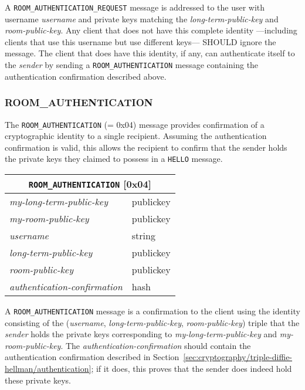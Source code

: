 \documentclass{article}
\def\message#1{\texttt{#1}}
\def\field#1{\textit{#1}}
\def\type#1{\textsf{#1}}
\newenvironment{basicmessage}[2]{
\newcommand{\messagefield}[2]{
\field{##1} & \type{##2} \\
\hline
}
\hspace{2em minus 2em}\begin{tabular}{|l|l|}
\hline
\multicolumn{2}{|c|}{\message{#1} [#2]} \\
\hline
\hline
}{
\end{tabular}
}
\begin{document}
A \message{ROOM\_AUTHENTICATION\_REQUEST} message is addressed to the user with username \field{username} and private keys matching the \field{long-term-public-key} and \field{room-public-key}.
Any client that does not have this complete identity ---including clients that use this username but use different keys--- SHOULD ignore the message.
The client that does have this identity, if any, can authenticate itself to the \field{sender} by sending a \message{ROOM\_AUTHENTICATION} message containing the authentication confirmation described above.


\subsubsection{ROOM\_AUTHENTICATION}
\label{sec:messages/room-authentication}

The \message{ROOM\_AUTHENTICATION} (= 0x04) message provides confirmation of a cryptographic identity to a single recipient.
Assuming the authentication confirmation is valid, this allows the recipient to confirm that the sender holds the private keys they claimed to possess in a \message{HELLO} message.

\begin{basicmessage}{ROOM\_AUTHENTICATION}{0x04}
\messagefield{my-long-term-public-key}{publickey}
\messagefield{my-room-public-key}{publickey}
\messagefield{username}{string}
\messagefield{long-term-public-key}{publickey}
\messagefield{room-public-key}{publickey}
\messagefield{authentication-confirmation}{hash}
\end{basicmessage}

A \message{ROOM\_AUTHENTICATION} message is a confirmation to the client using the identity consisting of the (\field{username}, \field{long-term-public-key}, \field{room-public-key}) triple that the \field{sender} holds the private keys corresponding to \field{my-long-term-public-key} and \field{my-room-public-key}.
The \emph{authentication-confirmation} should contain the authentication confirmation described in Section~\ref{sec:cryptography/triple-diffie-hellman/authentication}; if it does, this proves that the sender does indeed hold these private keys.
\end{document}
